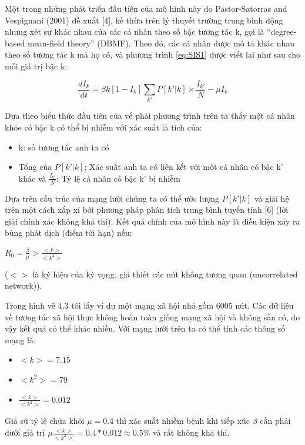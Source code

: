 \documentclass[]{book}
\begin{document}
Một trong những phát triển đầu tiên của mô hình này do Pastor-Satorras
and Vespignani (2001) đề xuất {[}4{]}, kế thừa trên lý thuyết trường
trung bình động nhưng xét sự khác nhau của các cá nhân theo số bậc tương
tác k, gọi là ``degree-based mean-field theory'' (DBMF). Theo đó, các cá
nhân được mô tả khác nhau theo số tương tác k mà họ có, và phương trình
\eqref{eq:SIS1} được viết lại như sau cho mỗi giá trị bậc k:

\begin{equation} 
  \frac{dI_k}{dt} = \beta k [1-I_k]\sum_{k'} P[k'|k]\times \frac{I_{k'}}{N} -\mu I_k
  \label{eq:DBMF1}
\end{equation}

Dựa theo biểu thức đầu tiên của vế phải phương trình trên ta thấy một cá
nhân khỏe có bậc k có thể bị nhiễm với xác suất là tích của:

\begin{itemize}
\item
  k: số tương tác anh ta có
\item
  Tổng của \(P[k'|k]\): Xác suất anh ta có liên kết với một cá nhân có
  bậc k' khác và \(\frac{I_{k'}}{N}\): Tỷ lệ cá nhân có bậc k' bị nhiễm
\end{itemize}

Dựa trên cấu trúc của mạng lưới chúng ta có thể ước lượng \(P[k'|k]\) và
giải hệ trên một cách xấp xỉ bởi phương pháp phân tích trung bình tuyến
tính {[}6{]} (lời giải chính xác không khả thi). Kết quả chính của mô
hình này là điều kiện xảy ra bùng phát dịch (điểm tới hạn) nếu:

\(R_0 = \frac{\beta}{\mu} > \frac{<k>}{<k^2>}\)

(\(<>\) là ký hiệu của kỳ vọng, giả thiết các nút không tương quan
(uncorrelated network)).

Trong hình vẽ 4.3 tôi lấy ví dụ một mạng xã hội nhỏ gồm 6005 nút. Các dữ
liệu về tương tác xã hội thực không hoàn toàn giống mạng xã hội và không
sẵn có, do vậy kết quả có thể khác nhiều. Với mạng lưới trên ta có thể
tính các thông số mạng là:

\begin{itemize}
\item
  \(<k> = 7.15\)
\item
  \(<k^2> = 79\)
\item
  \(\frac{<k>}{<k^2>} = 0.012\)
\end{itemize}

Giả sử tỷ lệ chữa khỏi \(\mu = 0.4\) thì xác suất nhiễm bệnh khi tiếp
xúc \(\beta\) cần phải dưới giá trị
\(\mu\frac{<k>}{<k^2>} = 0.4*0.012 \approx 0.5\%\) và rất không khả thi.
\end{document}
